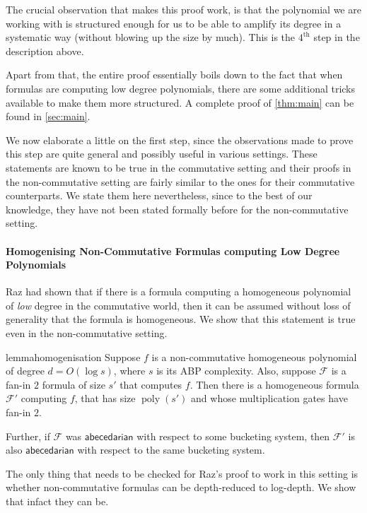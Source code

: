 \documentclass[10pt,a4paper]{article}
\def\poly{\operatorname{poly}}
\newcommand{\form}{\textbf{$\mathcal{F}$}}
\newcommand{\abcd}{\mathsf{abecedarian}}
\begin{document}
\noindent The crucial observation that makes this proof work, is that the polynomial we are working with is structured enough for us to be able to amplify its degree in a systematic way (without blowing up the size by much).
This is the $4^{\text{th}}$ step in the description above.

Apart from that, the entire proof essentially boils down to the fact that when formulas are computing low degree polynomials, there are some additional tricks available to make them more structured.
A complete proof of \autoref{thm:main} can be found in \autoref{sec:main}.

We now elaborate a little on the first step, since the observations made to prove this step are quite general and possibly useful in various settings.
These statements are known to be true in the commutative setting and their proofs in the non-commutative setting are fairly similar to the ones for their commutative counterparts.
We state them here nevertheless, since to the best of our knowledge, they have not been stated formally before for the non-commutative setting.

\paragraph*{Homogenising Non-Commutative Formulas computing Low Degree Polynomials}

Raz \cite{R13} had shown that if there is a formula computing a homogeneous polynomial of \emph{low} degree in the commutative world, then it can be assumed without loss of generality that the formula is homogeneous.
We show that this statement is true even in the non-commutative setting. 

\begin{restatable}{lemma}{homogenisation}\label{lem:homogenisation}
	Suppose $f$ is a non-commutative homogeneous polynomial of degree $d = O(\log s)$, where $s$ is its ABP complexity. 
	Also, suppose $\form$ is a fan-in $2$ formula of size $s'$ that computes $f$.
	Then there is a homogeneous formula $\form'$ computing $f$, that has size $\poly(s')$ and whose multiplication gates have fan-in $2$.

	Further, if $\form$ was $\abcd$ with respect to some bucketing system, then $\form'$ is also $\abcd$ with respect to the same bucketing system.
\end{restatable}

The only thing that needs to be checked for Raz's proof to work in this setting is whether non-commutative formulas can be depth-reduced to log-depth.
We show that infact they can be.
\end{document}
